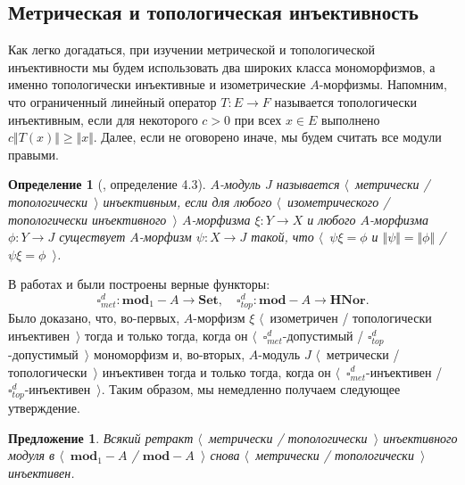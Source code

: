 \documentclass[12pt]{article}
\newtheorem{proposition}[theorem]{Предложение}
\newtheorem{definition}[theorem]{Определение}
\begin{document}

\subsection{Метрическая и топологическая инъективность}
\label{SubSectionMetricAndTopologicalInjectivity}

Как легко догадаться, при изучении метрической и топологической инъективности мы будем использовать два широких класса мономорфизмов, а именно топологически инъективные и изометрические $A$-морфизмы. Напомним, что ограниченный линейный оператор $T:E\to F$ называется топологически инъективным, если для некоторого $c>0$ при всех $x\in E$ выполнено $c\Vert T(x)\Vert\geq \Vert x\Vert$. Далее, если не оговорено иначе, мы будем считать все модули правыми.

\begin{definition}[\cite{HelMetrFrQMod}, определение 4.3]\label{MetTopInjMod} $A$-модуль $J$ называется $\langle$~метрически / топологически~$\rangle$ инъективным, если для любого $\langle$~изометрического / топологически инъективного~$\rangle$ $A$-морфизма $\xi:Y\to X$ и любого $A$-морфизма $\phi:Y\to J$ существует $A$-морфизм $\psi:X\to J$ такой, что $\langle$~$\psi\xi=\phi$ и $\Vert\psi\Vert=\Vert\phi\Vert$ / $\psi\xi=\phi$~$\rangle$.
\end{definition}

В работах \cite{HelMetrFrQMod} и \cite{ShtTopFrClassicQuantMod} были построены верные функторы:
$$
\square_{met}^d:\mathbf{mod}_1-A\to\mathbf{Set},
\quad
\square_{top}^d:\mathbf{mod}-A\to\mathbf{HNor}.
$$
Было доказано, что, во-первых, $A$-морфизм $\xi$ $\langle$~изометричен / топологически инъективен~$\rangle$ тогда и только тогда, когда он $\langle$~$\square_{met}^d$-допустимый / $\square_{top}^d$-допустимый~$\rangle$ мономорфизм и, во-вторых, $A$-модуль $J$ $\langle$~метрически / топологически~$\rangle$ инъективен тогда и только тогда, когда он $\langle$~$\square_{met}^d$-инъективен / $\square_{top}^d$-инъективен~$\rangle$. Таким образом, мы немедленно получаем следующее утверждение.

\begin{proposition}\label{RetrMetTopInjIsMetTopInj} Всякий ретракт $\langle$~метрически / топологически~$\rangle$ инъективного модуля в $\langle$~$\mathbf{mod}_1-A$ / $\mathbf{mod}-A$~$\rangle$ снова $\langle$~метрически / топологически~$\rangle$ инъективен.
\end{proposition}
\end{document}
